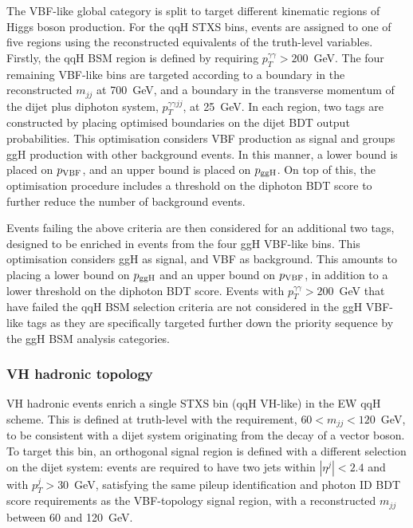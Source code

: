The VBF-like global category is split to target different kinematic regions of Higgs boson production. For the qqH STXS bins, events are assigned to one of five regions using the reconstructed equivalents of the truth-level variables. Firstly, the qqH BSM region is defined by requiring $p_T^{\gamma\gamma}>200$~GeV. The four remaining VBF-like bins are targeted according to a boundary in the reconstructed $m_{jj}$ at 700~GeV, and a boundary in the transverse momentum of the dijet plus diphoton system, $p_T^{\gamma\gamma jj}$, at 25~GeV. In each region, two tags are constructed by placing optimised boundaries on the dijet BDT output probabilities. This optimisation considers VBF production as signal and groups ggH production with other background events. In this manner, a lower bound is placed on $p_{\rm{VBF}}$, and an upper bound is placed on $p_{\rm{ggH}}$. On top of this, the optimisation procedure includes a threshold on the diphoton BDT score to further reduce the number of background events.

Events failing the above criteria are then considered for an additional two tags, designed to be enriched in events from the four ggH VBF-like bins. This optimisation considers ggH as signal, and VBF as background. This amounts to placing a lower bound on $p_{\rm{ggH}}$ and an upper bound on $p_{\rm{VBF}}$, in addition to a lower threshold on the diphoton BDT score. Events with $p_T^{\gamma\gamma}>200$~GeV that have failed the qqH BSM selection criteria are not considered in the ggH VBF-like tags as they are specifically targeted further down the priority sequence by the ggH BSM analysis categories.

\subsubsection{VH hadronic topology}
VH hadronic events enrich a single STXS bin (qqH VH-like) in the EW qqH scheme. This is defined at truth-level with the requirement, $60<m_{jj}<120$~GeV, to be consistent with a dijet system originating from the decay of a vector boson. To target this bin, an orthogonal signal region is defined with a different selection on the dijet system: events are required to have two jets within $|\eta^j|<2.4$ and with $p_T^j>30$~GeV, satisfying the same pileup identification and photon ID BDT score requirements as the VBF-topology signal region, with a reconstructed $m_{jj}$ between 60 and 120~GeV. 

